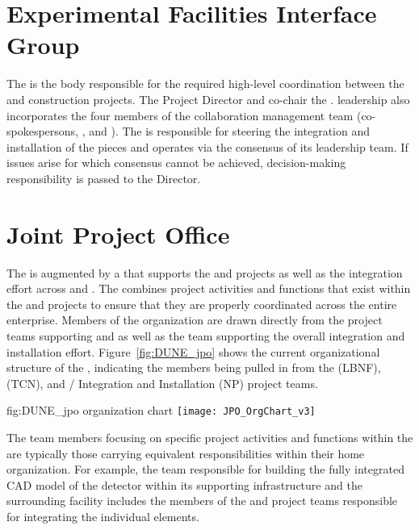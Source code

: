 \section{Experimental Facilities Interface Group}
\label{sec:efig}

The  is the body responsible for the required high-level
coordination between the  and  construction 
projects.  The  Project Director and  
co-chair the .   leadership also incorporates 
the four members of the  collaboration management 
team (co-spokespersons, , and ).  
The  is responsible for steering the integration and 
installation of the  pieces and operates via the 
consensus of its leadership team.  If issues arise for which consensus 
cannot be achieved, decision-making responsibility is passed to the 
 Director.

\section{Joint Project Office}
\label{sec:jpo}

The  is augmented by a  that supports the
 and  projects as well as the integration
effort across  and . The  
combines project activities and functions that exist within the 
 and  projects to ensure that they are 
properly coordinated across the entire enterprise.  Members of 
the  organization are drawn directly from the project 
teams supporting  and  as well as the 
team supporting the overall integration and installation effort.  
Figure~\ref{fig:DUNE_jpo} shows the current organizational 
structure of the , indicating the members being 
pulled in from the  (LBNF),  (TCN), and 
/ Integration and Installation (NP) 
project teams.
\begin{dunefigure}{fig:DUNE_jpo}
  { organization chart}
  \texttt{[image: JPO\_OrgChart\_v3]}
\end{dunefigure}
The team members focusing on specific project activities and 
functions within the  are typically those carrying 
equivalent responsibilities within their home organization.  For 
example, the  team responsible for building the fully 
integrated \threed CAD model of the detector within its supporting 
infrastructure and the surrounding facility includes the members 
of the  and  project teams responsible 
for integrating the individual elements.

